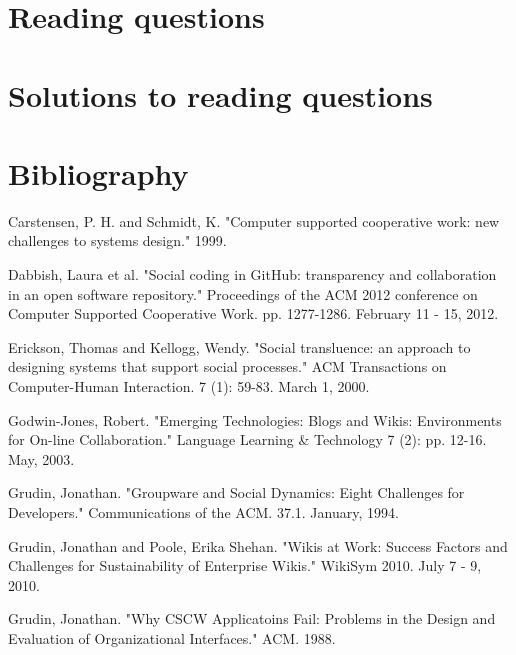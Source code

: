 \documentclass[class=book, crop=false]{standalone}
\begin{document}
\section{Reading questions}

\section{Solutions to reading questions}

\section{Bibliography}

Carstensen, P. H. and Schmidt, K. "Computer supported cooperative work: new challenges to systems design." 1999.

Dabbish, Laura et al. "Social coding in GitHub: transparency and collaboration in an open software repository." Proceedings of the ACM 2012 conference on Computer Supported Cooperative Work. pp. 1277-1286. February 11 - 15, 2012.

Erickson, Thomas and Kellogg, Wendy. "Social transluence: an approach to designing systems that support social processes." ACM Transactions on Computer-Human Interaction. 7 (1): 59-83. March 1, 2000.

Godwin-Jones, Robert. "Emerging Technologies: Blogs and Wikis: Environments for On-line Collaboration." Language Learning \& Technology 7 (2): pp. 12-16. May, 2003.

Grudin, Jonathan. "Groupware and Social Dynamics: Eight Challenges for Developers." Communications of the ACM. 37.1. January, 1994.

Grudin, Jonathan and Poole, Erika Shehan. "Wikis at Work: Success Factors and Challenges for Sustainability of Enterprise Wikis." WikiSym 2010. July 7 - 9, 2010.

Grudin, Jonathan. "Why CSCW Applicatoins Fail: Problems in the Design and Evaluation of Organizational Interfaces." ACM. 1988.
\end{document}
